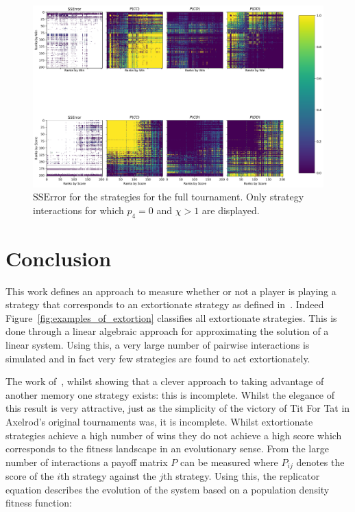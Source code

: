 \documentclass[a4paper]{article}
\begin{document}
\begin{figure}[!htbp]
    \centering
    \includegraphics[width=.8\textwidth]{./assets/img/SSError_and_probabilities_in_full/main.pdf}
    \caption{\(\text{SSError}\) for the strategies for the full tournament. Only
    strategy interactions for which \(p_4=0\) and \(\chi>1\) are displayed.}
    \label{fig:SSError_and_probabilities_in_full}
\end{figure}


\section{Conclusion}\label{sec:conclusion}

This work defines an approach to measure whether or not a player is playing a
strategy that corresponds to an extortionate strategy as defined
in~\cite{Press2012}. Indeed Figure~\ref{fig:examples_of_extortion} classifies
all extortionate strategies. This is done through a linear algebraic approach
for approximating the solution of a linear system. Using this, a very large
number of pairwise interactions is simulated and in fact very few strategies are
found to act extortionately.

The work of~\cite{Press2012}, whilst showing that a clever approach to taking
advantage of another memory one strategy exists: this is incomplete. Whilst the
elegance of this result is very attractive, just as the simplicity of the
victory of Tit For Tat in Axelrod's original tournaments was, it is incomplete.
Whilst extortionate strategies achieve a high number of wins they do not
achieve a high score which corresponds to the fitness landscape in an
evolutionary sense. From the large number of interactions a payoff matrix \(P\)
can be measured where \(P_{ij}\) denotes the score of the \(i\)th strategy
against the \(j\)th strategy. Using this, the replicator equation
describes the evolution of the system based on a population density fitness
function:
\end{document}
